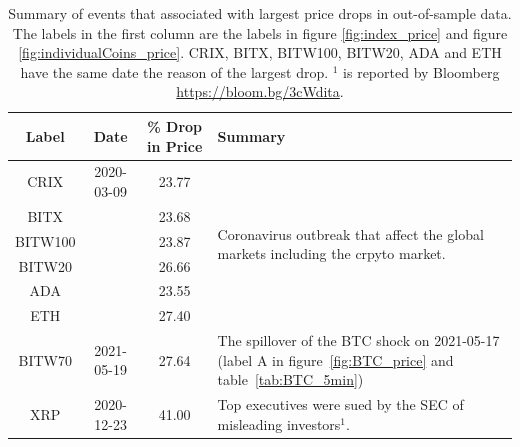 \begin{table}[t]
    \centering
      \begin{tabularx}{.8\textwidth}{cccX}
        \toprule
        Label &  Date & \% Drop in Price &  Summary\\
        \midrule
        CRIX    &2020-03-09 & 23.77 & \multirow[t]{6}{\hsize}{Coronavirus outbreak that affect the global markets including the crpyto market.}\\
        BITX    & & 23.68 &  \\
        BITW100 & & 23.87 &  \\
        BITW20  & & 26.66 &  \\
        ADA     & &23.55 &  \\
        ETH     & &27.40 &  \\
        BITW70  & 2021-05-19& 27.64 & The spillover of the BTC shock on 2021-05-17 (label A in figure~\ref{fig:BTC_price} and table~\ref{tab:BTC_5min})\\
        XRP     & 2020-12-23 & 41.00 & Top executives were sued by the SEC of misleading investors$^1$. \\
        \bottomrule
      \end{tabularx}
        \caption{Summary of events that associated with largest price drops in out-of-sample data.
        The labels in the first column are the labels in figure \ref{fig:index_price} and figure \ref{fig:individualCoins_price}.
        CRIX, BITX, BITW100, BITW20, ADA and ETH have the same date the reason of the largest drop. $^1$ is reported by Bloomberg \url{https://bloom.bg/3cWdita}.}
        \label{tab:All_min}
  \end{table}


